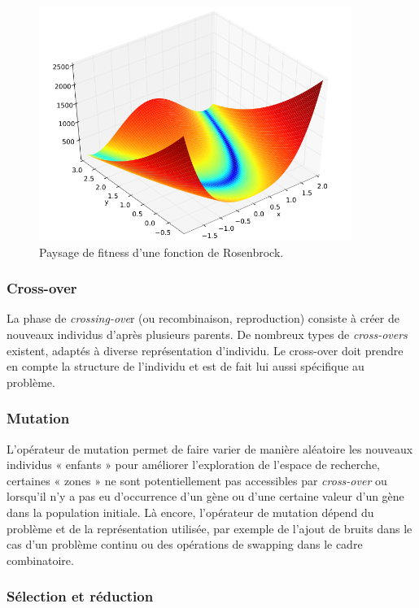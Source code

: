 \documentclass[french, 11pt]{memoir}
\begin{document}
\begin{figure}[htbp]
	\begin{center}
		\includegraphics[width=4in]{img/fitnessLandscape.png}
		\caption{Paysage de fitness d'une fonction de Rosenbrock.}
	\end{center}
\end{figure}


\subsubsection{Cross-over}\label{cross-over}

La phase de \emph{crossing-ove}r (ou recombinaison, reproduction)
consiste à créer de nouveaux individus d'après plusieurs parents. De
nombreux types de \emph{cross-overs} existent, adaptés à diverse
représentation d'individu. Le cross-over doit prendre en compte la
structure de l'individu et est de fait lui aussi spécifique au problème.

\subsubsection{Mutation}\label{mutation}

L'opérateur de mutation permet de faire varier de manière aléatoire les
nouveaux individus « enfants » pour améliorer l'exploration de l'espace
de recherche, certaines « zones » ne sont potentiellement pas
accessibles par \emph{cross-over} ou lorsqu'il n'y a pas eu d'occurrence
d'un gène ou d'une certaine valeur d'un gène dans la population
initiale. Là encore, l'opérateur de mutation dépend du problème et de la
représentation utilisée, par exemple de l'ajout de bruits dans le cas
d'un problème continu ou des opérations de swapping dans le cadre
combinatoire.

\subsubsection{Sélection et
réduction}\label{suxe9lection-et-ruxe9duction}
\end{document}
